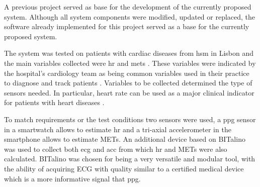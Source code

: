 A previous project \cite{telemold} served as base for the development of the currently proposed system. Although all system components were modified, updated or replaced, the software already implemented for this project served as a base for the currently proposed system.

The system was tested on patients with cardiac diseases from \ac{hsm} in Lisbon and the main variables collected were \ac{hr} and \ac{mets} \cite{crouter_METS}. These variables were indicated by the hospital's cardiology team as being common variables used in their practice to diagnose and track patients \cite{importancia_HR_METS, importancia_HR_METS_2}. Variables to be collected determined the type of sensors needed. In particular, heart rate can be used as a major clinical indicator for patients with heart diseases \cite{doenca1, doenca2, doenca3}.

To match requirements or the test conditions two sensors were used, a \ac{ppg} sensor in a smartwatch allows to estimate \ac{hr} and a tri-axial accelerometer in the smartphone allows to estimate METs. An additional device based on BITalino was used to collect both \ac{ecg} and \ac{acc} from which \ac{hr} and METs were also calculated. BITalino was chosen for being a very versatile and modular tool, with the ability of acquiring ECG with quality similar to a certified medical device \cite{bitalinobatista2017experimental,bitalinoguerreiro2013bitalino} which is a more informative signal that \ac{ppg}.

